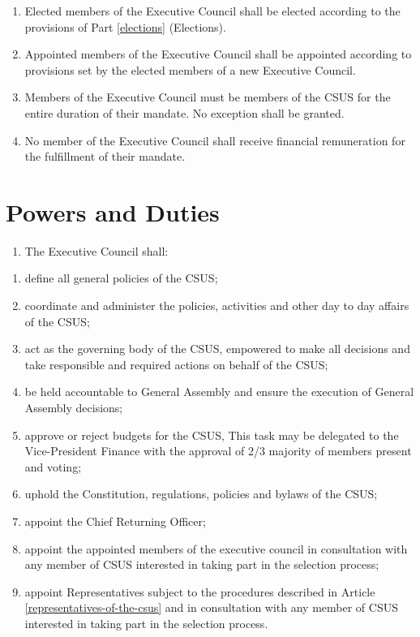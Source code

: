 \begin{enumerate}
\def\labelenumi{\arabic{enumi}.}
\setcounter{enumi}{1}
\item
  Elected members of the Executive Council
  shall be elected according to the provisions of Part \ref{elections} (Elections).
\item
  Appointed members of the Executive Council
  shall be appointed according to provisions set by the elected members of
  a new Executive Council.
\item
  Members of the Executive Council must be members of the CSUS for the
  entire duration of their mandate. No exception shall be granted.
\item
  No member of the Executive Council shall receive financial
  remuneration for the fulfillment of their mandate.
\end{enumerate}

\section{Powers and Duties}\label{powers-and-duties}

\begin{enumerate}
\def\labelenumi{\arabic{enumi}.}
\tightlist
\item
  The Executive Council shall:
\end{enumerate}

\begin{enumerate}
\def\labelenumi{(\alph{enumi})}
\item
  define all general policies of the CSUS;
\item
  coordinate and administer the policies, activities and other day to
  day affairs of the CSUS;
\item
  act as the governing body of the CSUS, empowered to make all decisions
  and take responsible and required actions on behalf of the CSUS;
\item
  be held accountable to General Assembly and ensure the execution of
  General Assembly decisions;
\item
  approve or reject budgets for the CSUS, This task may be delegated
  to the Vice-President Finance with the approval of 2/3 majority of
  members present and voting;
\item
  uphold the Constitution, regulations, policies and bylaws of the CSUS;
\item
  appoint the Chief Returning Officer;
\item
  appoint the appointed members of the executive council in consultation with any member of CSUS interested in taking part in the selection process;
\item
  appoint Representatives subject to the procedures described in Article \ref{representatives-of-the-csus} and in consultation with any member of CSUS interested in taking part in the selection process.
\end{enumerate}

